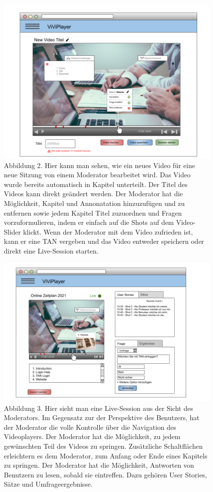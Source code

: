 \begin{figure}
  \includegraphics[width=\linewidth]{5dot2.png}
  \caption{Abbildung 2. Hier kann man sehen, wie ein neues Video für eine neue Sitzung von einem Moderator bearbeitet wird. Das Video wurde bereits automatisch in Kapitel unterteilt. Der Titel des Videos kann direkt geändert werden. Der Moderator hat die Möglichkeit, Kapitel und Annonatation hinzuzufügen und zu entfernen sowie jedem Kapitel Titel zuzuordnen und Fragen vorzuformulieren, indem er einfach auf die Shots auf dem Video-Slider klickt. Wenn der Moderator mit dem Video zufrieden ist, kann er eine TAN vergeben und das Video entweder speichern oder direkt eine Live-Session starten.}
  \label{fig:5dot2}
\end{figure}

\begin{figure}
  \includegraphics[width=\linewidth]{5dot3.png}
  \caption{Abbildung 3. Hier sieht man eine Live-Session aus der Sicht des Moderators. Im Gegensatz zur der Perspektive des Benutzers, hat der Moderator die volle Kontrolle über die Navigation des Videoplayers. Der Moderator hat die Möglichkeit, zu jedem gewünschten Teil des Videos zu springen. Zusätzliche Schaltflächen erleichtern es dem Moderator, zum Anfang oder Ende eines Kapitels zu springen. Der Moderator hat die Möglichkeit, Antworten von Benutzern zu lesen, sobald sie eintreffen. Dazu gehören User Stories, Sätze und Umfrageergebnisse.}
  \label{fig:5dot3}
\end{figure}

